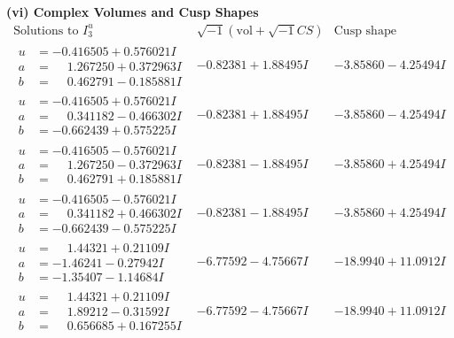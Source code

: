 \documentclass[1p]{elsarticle_modified}
\theoremstyle{definition}
\newcommand{\I}{\sqrt{-1}}
\begin{document}
\newpage\flushleft \textbf{(vi) Complex Volumes and Cusp Shapes}
$$\begin{array}{c|c|c}  
\text{Solutions to }I^u_{3}& \I (\text{vol} + \sqrt{-1}CS) & \text{Cusp shape}\\
 \hline 
\begin{aligned}
u &= -0.416505 + 0.576021 I \\
a &= \phantom{-}1.267250 + 0.372963 I \\
b &= \phantom{-}0.462791 - 0.185881 I\end{aligned}
 & -0.82381 + 1.88495 I & -3.85860 - 4.25494 I \\ \hline\begin{aligned}
u &= -0.416505 + 0.576021 I \\
a &= \phantom{-}0.341182 - 0.466302 I \\
b &= -0.662439 + 0.575225 I\end{aligned}
 & -0.82381 + 1.88495 I & -3.85860 - 4.25494 I \\ \hline\begin{aligned}
u &= -0.416505 - 0.576021 I \\
a &= \phantom{-}1.267250 - 0.372963 I \\
b &= \phantom{-}0.462791 + 0.185881 I\end{aligned}
 & -0.82381 - 1.88495 I & -3.85860 + 4.25494 I \\ \hline\begin{aligned}
u &= -0.416505 - 0.576021 I \\
a &= \phantom{-}0.341182 + 0.466302 I \\
b &= -0.662439 - 0.575225 I\end{aligned}
 & -0.82381 - 1.88495 I & -3.85860 + 4.25494 I \\ \hline\begin{aligned}
u &= \phantom{-}1.44321 + 0.21109 I \\
a &= -1.46241 - 0.27942 I \\
b &= -1.35407 - 1.14684 I\end{aligned}
 & -6.77592 - 4.75667 I & -18.9940 + 11.0912 I \\ \hline\begin{aligned}
u &= \phantom{-}1.44321 + 0.21109 I \\
a &= \phantom{-}1.89212 - 0.31592 I \\
b &= \phantom{-}0.656685 + 0.167255 I\end{aligned}
 & -6.77592 - 4.75667 I & -18.9940 + 11.0912 I \\ \hline\begin{aligned}

\end{aligned}
\end{array}$$
\end{document}
